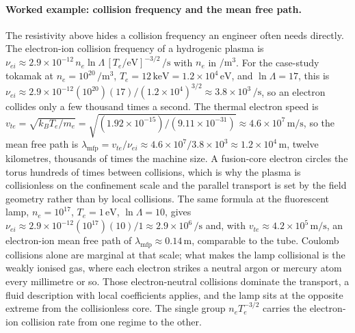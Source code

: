\paragraph{Worked example: collision frequency and the mean free path.}
The resistivity above hides a collision frequency an engineer often needs
directly. The electron-ion collision frequency of a hydrogenic plasma is
$\nu_{ei} \approx 2.9\times 10^{-12}\,n_e\ln\Lambda\,[T_e/\text{eV}]^{-3/2}\,
\si{\per\second}$ with $n_e$ in $\si{\per\meter\cubed}$. For the case-study tokamak at $n_e = 10^{20}\,\si{\per\meter
\cubed}$, $T_e = 12\,\si{\kilo\electronvolt} = 1.2\times 10^{4}\,\text{eV}$,
and $\ln\Lambda = 17$, this is $\nu_{ei} \approx 2.9\times 10^{-12}(10^{20})(17)
/(1.2\times 10^{4})^{3/2} \approx 3.8\times 10^{3}\,\si{\per\second}$, so an
electron collides only a few thousand times a second. The thermal electron
speed is $v_{te} = \sqrt{k_B T_e/m_e} = \sqrt{(1.92\times 10^{-15})/(9.11\times
10^{-31})} \approx 4.6\times 10^{7}\,\si{\meter\per\second}$, so the mean free
path is $\lambda_{\mathrm{mfp}} = v_{te}/\nu_{ei} \approx 4.6\times 10^{7}/
3.8\times 10^{3} \approx 1.2\times 10^{4}\,\si{\meter}$, twelve kilometres,
thousands of times the machine size. A fusion-core electron circles the torus
hundreds of times between collisions, which is why the plasma is collisionless
on the confinement scale and the parallel transport is set by the field
geometry rather than by local collisions. The same formula at the fluorescent
lamp, $n_e = 10^{17}$, $T_e = 1\,\text{eV}$, $\ln\Lambda = 10$, gives
$\nu_{ei} \approx 2.9\times 10^{-12}(10^{17})(10)/1 \approx 2.9\times
10^{6}\,\si{\per\second}$ and, with $v_{te} \approx 4.2\times 10^{5}\,\si{
\meter\per\second}$, an electron-ion mean free path of $\lambda_{\mathrm{mfp}}
\approx 0.14\,\si{\meter}$, comparable to the tube. Coulomb collisions alone
are marginal at that scale; what makes the lamp collisional is the weakly
ionised gas, where each electron strikes a neutral argon or mercury atom
every millimetre or so. Those electron-neutral collisions dominate the
transport, a fluid description with local coefficients applies, and the lamp
sits at the opposite extreme from the collisionless core. The single group
$n_e T_e^{-3/2}$ carries the electron-ion collision rate from one regime to
the other.



